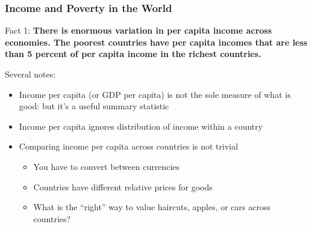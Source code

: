 \documentclass[shownotes,11pt, aspectratio=169]{beamer}
\begin{document}
\begin{frame}
\frametitle{Income and Poverty in the World}    
 \begin{figure}[ht]
\centering
\end{figure}
\end{frame}


\begin{frame}
Fact 1: \textbf{There is enormous variation in per capita income across economies. The poorest countries have per capita incomes that are less than 5 percent of per capita income in the richest countries.}

\vspace{.25in}\noindent Several notes:
\begin{itemize}
	\item Income per capita (or GDP per capita) is not the sole measure of what is good: but it's a useful summary statistic
	\item Income per capita ignores distribution of income within a country
	\item Comparing income per capita across countries is not trivial
	\begin{itemize}
		\item You have to convert between currencies
		\item Countries have different relative prices for goods
		\item What is the ``right'' way to value haircuts, apples, or cars across countries?
	\end{itemize}
\end{itemize}
\end{frame}
\end{document}
